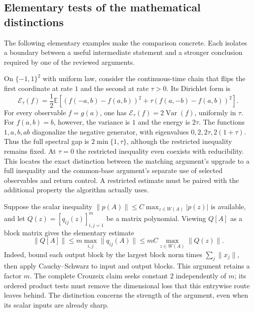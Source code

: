 \subsection{Elementary tests of the mathematical distinctions}
\label{subsec:contrastive-tests}
The following elementary examples make the comparison concrete. Each
isolates a boundary between a useful intermediate statement and a stronger
conclusion required by one of the reviewed arguments.

\begin{example}
On $\{-1,1\}^2$ with uniform law, consider the continuous-time chain
that flips the first coordinate at rate $1$ and the second at rate
$\tau>0$. Its Dirichlet form is
\[
 \mathcal E_\tau(f)=\frac12\mathbb E\!\left[
 (f(-a,b)-f(a,b))^2+\tau(f(a,-b)-f(a,b))^2\right].
\]
For every observable $f=g(a)$, one has
$\mathcal E_\tau(f)=2\operatorname{Var}(f)$, uniformly in $\tau$.
For $f(a,b)=b$, however, the variance is $1$ and the energy is $2\tau$.
The functions $1,a,b,ab$ diagonalize the negative generator, with
eigenvalues $0,2,2\tau,2(1+\tau)$. Thus the full spectral gap is
$2\min\{1,\tau\}$, although the restricted inequality remains fixed.
At $\tau=0$ the restricted inequality even coexists with reducibility.
This locates the exact distinction between the matching argument's
upgrade to a full inequality and the common-base argument's separate
use of selected observables and return control. A restricted estimate
must be paired with the additional property the algorithm actually uses.
\end{example}

\begin{example}
Suppose the scalar inequality
$\|p(A)\|\le C\max_{z\in W(A)}|p(z)|$ is available, and let
$Q(z)=[q_{ij}(z)]_{i,j=1}^m$ be a matrix polynomial. Viewing $Q[A]$
as a block matrix gives the elementary estimate
\[
 \|Q[A]\|\le m\max_{i,j}\|q_{ij}(A)\|
 \le mC\max_{z\in W(A)}\|Q(z)\|.
\]
Indeed, bound each output block by the largest block norm times
$\sum_j\|x_j\|$, then apply Cauchy--Schwarz to input and output blocks.
This argument retains a factor $m$. The complete Crouzeix claim seeks
constant $2$ independently of $m$; its ordered product tests must remove
the dimensional loss that this entrywise route leaves behind. The
distinction concerns the strength of the argument, even when its scalar
inputs are already sharp.
\end{example}

